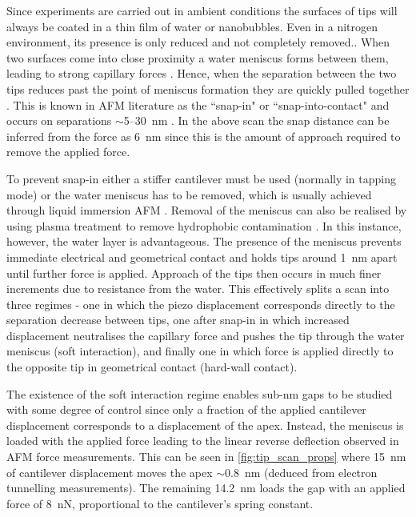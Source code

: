 \documentclass[a4paper]{article}
\begin{document}
Since experiments are carried out in ambient conditions the surfaces of tips will always be coated in a thin film of water or nanobubbles. Even in a nitrogen environment, its presence is only reduced and not completely removed.. When two surfaces come into close proximity a water meniscus forms between them, leading to strong capillary forces \cite{gan2009atomic}. Hence, when the separation between the two tips reduces past the point of meniscus formation they are quickly pulled together \cite{holmberg2003}. This is known in AFM literature as the ``snap-in" or ``snap-into-contact" and occurs on separations $\sim$5--\SI{30}{nm} \cite{holmberg2003, song2014}. In the above scan the snap distance can be inferred from the force as \SI{6}{nm} since this is the amount of approach required to remove the applied force.

To prevent snap-in either a stiffer cantilever must be used (normally in tapping mode) \cite{zhong1993fractured} or the water meniscus has to be removed, which is usually achieved through liquid immersion AFM \cite{hansma1994tapping, putman1994tapping, song2014}. Removal of the meniscus can also be realised by using plasma treatment to remove hydrophobic contamination \cite{song2014}. In this instance, however, the water layer is advantageous. The presence of the meniscus prevents immediate electrical and geometrical contact and holds tips around \SI{1}{nm} apart until further force is applied. Approach of the tips then occurs in much finer increments due to resistance from the water. This effectively splits a scan into three regimes - one in which the piezo displacement corresponds directly to the separation decrease between tips, one after snap-in in which increased displacement neutralises the capillary force and pushes the tip through the water meniscus (soft interaction), and finally one in which force is applied directly to the opposite tip in geometrical contact (hard-wall contact).

The existence of the soft interaction regime enables sub-nm gaps to be studied with some degree of control since only a fraction of the applied cantilever displacement corresponds to a displacement of the apex. Instead, the meniscus is loaded with the applied force leading to the linear reverse deflection observed in AFM force measurements. This can be seen in \autoref{fig:tip_scan_props} where \SI{15}{nm} of cantilever displacement moves the apex $\sim$\SI{0.8}{nm} (deduced from electron tunnelling measurements). The remaining \SI{14.2}{nm} loads the gap with an applied force of \SI{8}{nN}, proportional to the cantilever's spring constant.
\end{document}
